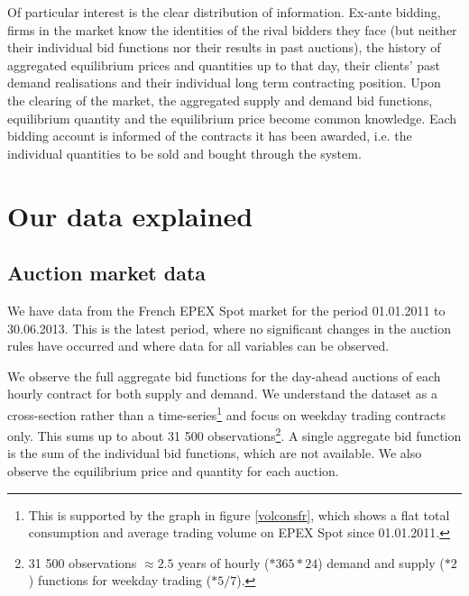 Of particular interest is the clear distribution of information. Ex-ante bidding, firms in the market know the identities of the rival bidders they face (but neither their individual bid functions nor their results in past auctions), the history of aggregated equilibrium prices and quantities up to that day, their clients' past demand realisations and their individual long term contracting position. Upon the clearing of the market, the aggregated supply and demand bid functions, equilibrium quantity and the equilibrium price become common knowledge. Each bidding account is informed of the contracts it has been awarded, i.e. the individual quantities to be sold and bought through the system.


\section{Our data explained}

\label{pschapter}

\label{datasection}
\subsection*{Auction market data}
We have data from the French EPEX Spot market for the period 01.01.2011 to 30.06.2013. This is the latest period, where no significant changes in the auction rules have occurred and where data for all variables can be observed. 

We observe the full aggregate bid functions for the day-ahead auctions of each hourly contract for both supply and demand. 
We understand the dataset as a cross-section rather than a time-series\footnote{This is supported by the graph in figure \ref{volconsfr}, which shows a flat total consumption and average trading volume on EPEX Spot since 01.01.2011.} and focus on weekday trading contracts only. 
This sums up to about 31 500 observations\footnote{31 500 observations $\approx 2.5$ years of hourly ($*365 *24$) demand and supply ($*2$) functions for weekday trading ($*5/7$).}. A single aggregate bid function is the sum of the individual bid functions, which are not available. %
We also observe the equilibrium price and quantity for each auction.

